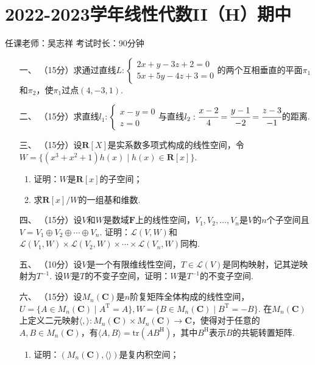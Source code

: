 \section*{2022-2023学年线性代数II（H）期中}

\begin{center}
    任课老师：吴志祥\hspace{4em} 考试时长：90分钟
\end{center}

\begin{enumerate}
	\item[一、]（15分）求通过直线$L:\begin{cases}
        2x+y-3z+2=0 \\ 5x+5y-4z+3=0
    \end{cases}$的两个互相垂直的平面$\pi_1$和$\pi_2$，使$\pi_1$过点$(4,-3,1)$.
	\item[二、]（15分）求直线$l_1:\begin{cases}
        x-y=0 \\ z=0
    \end{cases}$与直线$l_2:\cfrac{x-2}{4}=\cfrac{y-1}{-2}=\cfrac{z-3}{-1}$的距离.
	\item[三、]（15分）设$\mathbf{R}[X]$是实系数多项式构成的线性空间，令$W=\{(x^3+x^2+1)h(x)\mid h(x)\in\mathbf{R}[x]\}$.
	\begin{enumerate}[label=(\arabic*)]
        \item 证明：$W$是$\mathbf{R}[x]$的子空间；

        \item 求$\mathbf{R}[x]/W$的一组基和维数.
    \end{enumerate}
	\item[四、]（15分）设$V$和$W$是数域$\mathbf{F}$上的线性空间，$V_1,V_2,\ldots,V_n$是$V$的$n$个子空间且$V=V_1\oplus V_2\oplus\cdots\oplus V_n$. 证明：$\mathcal{L}(V,W)$和$\mathcal{L}(V_1,W)\times\mathcal{L}(V_2,W)\times\cdots\times\mathcal{L}(V_n,W)$同构.
	\item[五、]（10分）设$V$是一个有限维线性空间，$T\in\mathcal{L}(V)$是同构映射，记其逆映射为$T^{-1}$. 设$W$是$T$的不变子空间，证明：$W$是$T^{-1}$的不变子空间.
	\item[六、]（15分）设$M_n(\mathbf{C})$是$n$阶复矩阵全体构成的线性空间，$U=\{A\in M_n(\mathbf{C})\mid A^{\mathrm{T}}=A\},W=\{B\in M_n(\mathbf{C})\mid B^{\mathrm{T}}=-B\}$. 在$M_n(\mathbf{C})$上定义二元映射$\langle,\rangle: M_n(\mathbf{C})\times M_n(\mathbf{C})\to\mathbf{C}$，使得对于任意的$A,B\in M_n(\mathbf{C})$，有$\langle A,B\rangle=\mathrm{tr}(AB^{\mathrm{H}})$，其中$B^{\mathrm{H}}$表示$B$的共轭转置矩阵.
	\begin{enumerate}
        \item 证明：$(M_n(\mathbf{C}),\langle\rangle)$是复内积空间；


\end{enumerate}
\end{enumerate}

